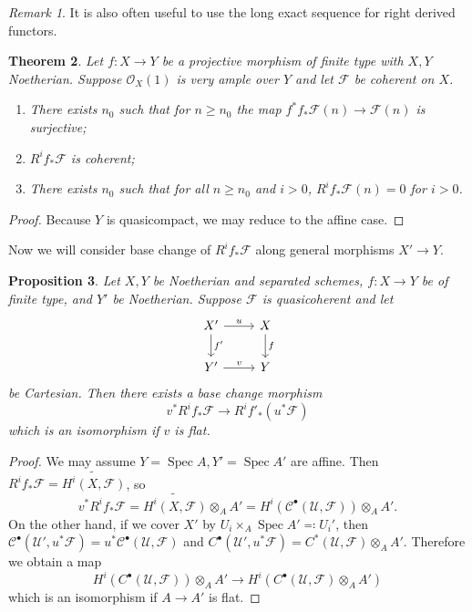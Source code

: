 \documentclass[leqno, openany]{memoir}
\newtheorem{thm}{Theorem}[section]
\newtheorem{prop}[thm]{Proposition}
\theoremstyle{definition}
\theoremstyle{remark}
\newtheorem{rmk}[thm]{Remark}
\theoremstyle{plain}
\theoremstyle{definition}
\theoremstyle{remark}
\newcommand{\mc}[1]{\mathcal{#1}}
\newcommand{\wt}[1]{\widetilde{#1}}
\DeclareMathOperator{\Spec}{Spec}
\begin{document}
\begin{rmk} It is also often useful to use the long exact sequence for right
derived functors.  \end{rmk}

\begin{thm} Let $f \colon X \to Y$ be a projective morphism of finite type with
    $X, Y$ Noetherian. Suppose $\mc{O}_X(1)$ is very ample over $Y$ and let
    $\mc{F}$ be coherent on $X$.  \begin{enumerate} \item There exists $n_0$
        such that for $n \geq n_0$ the map $f^* f_* \mc{F}(n) \to \mc{F}(n)$ is
        surjective; \item $R^i f_* \mc{F}$ is coherent; \item   There exists
$n_0$ such that for all $n \geq n_0$ and $i > 0$, $R^i f_* \mc{F}(n) = 0$ for
$i > 0$.  \end{enumerate} \end{thm}

\begin{proof} Because $Y$ is quasicompact, we may reduce to the affine case.
\end{proof}

Now we will consider base change of $R^i f_* \mc{F}$ along general morphisms
$X' \to Y$.

\begin{prop} Let $X, Y$ be Noetherian and separated schemes, $f \colon X \to Y$
    be of finite type, and $Y'$ be Noetherian. Suppose $\mc{F}$ is
    quasicoherent and let \begin{equation*} \begin{tikzcd} X' \ar{r}{u}
        \ar{d}{f'} & X \ar{d}{f} \\ Y' \ar{r}{v} & Y \end{tikzcd}
        \end{equation*} be Cartesian. Then there exists a base change morphism
        \[ v^* R^i f_* \mc{F} \to R^i f'_* (u^* \mc{F}) \] which is an
    isomorphism if $v$ is flat.  \end{prop}

\begin{proof} We may assume $Y = \Spec A, Y' = \Spec A'$ are affine. Then $R^i
    f_* \mc{F} = \wt{H^i(X, \mc{F})}$, so \[ v^* R^i f_* \mc{F} = \wt{H^i(X,
    \mc{F})} \otimes_A A' = H^i(\mc{C}^{\bullet}(\mc{U}, \mc{F})) \otimes_A A'.
\] On the other hand, if we cover $X'$ by $U_i \times_A \Spec A' \eqqcolon
U_i'$, then $\mc{C}^{\bullet}(\mc{U}', u^* \mc{F}) = u^*
\mc{C}^{\bullet}(\mc{U}, \mc{F})$ and $C^{\bullet}(\mc{U}', u^* \mc{F}) =
C^*(\mc{U}, \mc{F}) \otimes_A A'$. Therefore we obtain a map \[
H^i(C^{\bullet}(\mc{U}, \mc{F})) \otimes_A A' \to H^i(C^{\bullet}(\mc{U},
\mc{F}) \otimes_A A') \] which is an isomorphism if $A \to A'$ is flat.
\end{proof}
\end{document}
